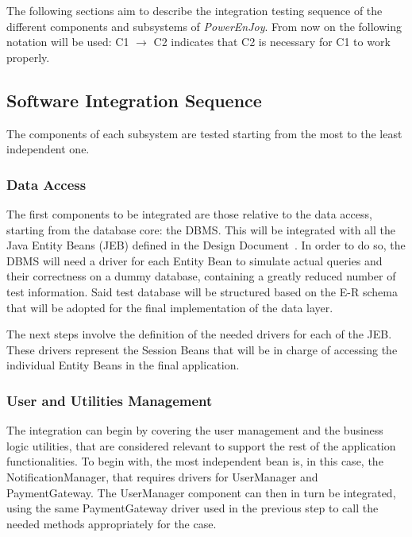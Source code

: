The following sections aim to describe the integration testing sequence of the different components and subsystems of \emph{PowerEnJoy}. From now on the following notation will be used: C1 $\rightarrow$ C2 indicates that C2 is necessary for C1 to work properly.

\subsection{Software Integration Sequence}
The components of each subsystem are tested starting from the most to the least independent one.

\subsubsection{Data Access}
The first components to be integrated are those relative to the data access, starting from the database core: the DBMS. This will be integrated with all the Java Entity Beans (JEB) defined in the Design Document~\cite{dd}. %
In order to do so, the DBMS will need a driver for each Entity Bean to simulate actual queries and their correctness on a dummy database, containing a greatly reduced number of test information. Said test database will be structured based on the E-R schema that will be adopted for the final implementation of the data layer.

The next steps involve the definition of the needed drivers for each of the JEB. These drivers represent the Session Beans that will be in charge of accessing the individual Entity Beans in the final application.

\subsubsection{User and Utilities Management}
The integration can begin by covering the user management and the business logic utilities, that are considered relevant to support the rest of the application functionalities. To begin with, the most independent bean is, in this case, the NotificationManager, that requires drivers for UserManager and PaymentGateway.
\noindent
The UserManager component can then in turn be integrated, using the same PaymentGateway driver used in the previous step to call the needed methods appropriately for the case.

